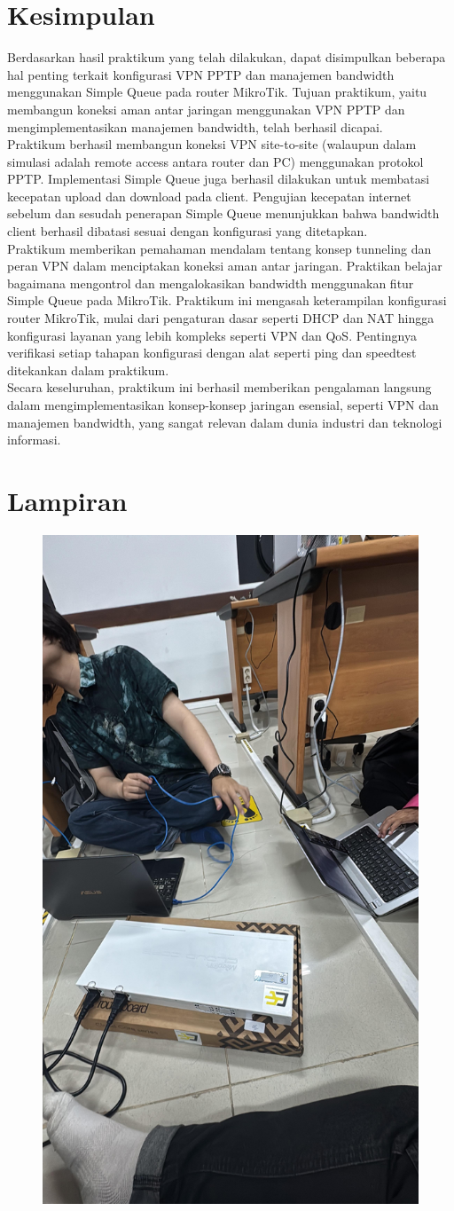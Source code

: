 \section{Kesimpulan}
Berdasarkan hasil praktikum yang telah dilakukan, dapat disimpulkan beberapa hal penting terkait konfigurasi VPN PPTP dan manajemen bandwidth menggunakan Simple Queue pada router MikroTik. Tujuan praktikum, yaitu membangun koneksi aman antar jaringan menggunakan VPN PPTP dan mengimplementasikan manajemen bandwidth, telah berhasil dicapai. \\ Praktikum berhasil membangun koneksi VPN site-to-site (walaupun dalam simulasi adalah remote access antara router dan PC) menggunakan protokol PPTP. Implementasi Simple Queue juga berhasil dilakukan untuk membatasi kecepatan upload dan download pada client. Pengujian kecepatan internet sebelum dan sesudah penerapan Simple Queue menunjukkan bahwa bandwidth client berhasil dibatasi sesuai dengan konfigurasi yang ditetapkan. \\ Praktikum memberikan pemahaman mendalam tentang konsep tunneling dan peran VPN dalam menciptakan koneksi aman antar jaringan. Praktikan belajar bagaimana mengontrol dan mengalokasikan bandwidth menggunakan fitur Simple Queue pada MikroTik. Praktikum ini mengasah keterampilan konfigurasi router MikroTik, mulai dari pengaturan dasar seperti DHCP dan NAT hingga konfigurasi layanan yang lebih kompleks seperti VPN dan QoS. Pentingnya verifikasi setiap tahapan konfigurasi dengan alat seperti ping dan speedtest ditekankan dalam praktikum. \\ Secara keseluruhan, praktikum ini berhasil memberikan pengalaman langsung dalam mengimplementasikan konsep-konsep jaringan esensial, seperti VPN dan manajemen bandwidth, yang sangat relevan dalam dunia industri dan teknologi informasi.

\section{Lampiran}
\begin{figure}[H]
    \centering
    \includegraphics[width=0.65\linewidth]{image/dokum.jpg}
\end{figure}
